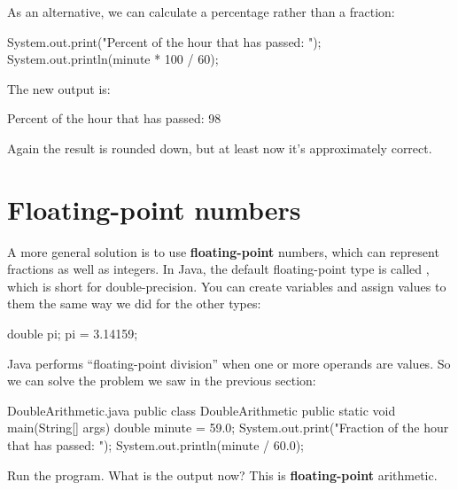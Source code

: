 As an alternative, we can calculate a percentage rather than a fraction:

\begin{code}
System.out.print("Percent of the hour that has passed: ");
System.out.println(minute * 100 / 60);
\end{code}

The new output is:

\begin{stdout}
Percent of the hour that has passed: 98
\end{stdout}

Again the result is rounded down, but at least now it's approximately correct.




\section{Floating-point numbers}


A more general solution is to use {\bf floating-point} numbers, which can represent fractions as well as integers.
In Java, the default floating-point type is called , which is short for double-precision.
You can create  variables and assign values to them the same way we did for the other types:

\begin{code}
double pi;
pi = 3.14159;
\end{code}

Java performs ``floating-point division'' when one or more operands are  values.
So we can solve the problem we saw in the previous section:

\begin{trinket}[210]{DoubleArithmetic.java}
public class DoubleArithmetic {
    public static void main(String[] args) {
        double minute = 59.0;
        System.out.print("Fraction of the hour that has passed: ");
        System.out.println(minute / 60.0);
    }
}
\end{trinket}

Run the program.  What is the output now?  This is \textbf{floating-point} arithmetic.


